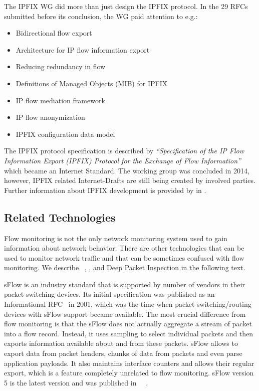 The IPFIX WG did more than just design the IPFIX protocol. In the 29 RFCs submitted before its conclusion, the WG paid attention to e.g.:
\begin{itemize}
	\item Bidirectional flow export~\cite{rfc5103}
	\item Architecture for IP flow information export~\cite{rfc5470}
	\item Reducing redundancy in flow~\cite{rfc5473}
	\item Definitions of Managed Objects (MIB) for IPFIX~\cite{rfc5815, rfc6615, rfc8038}
	\item IP flow mediation framework~\cite{rfc5982, rfc6183}
	\item IP flow anonymization~\cite{rfc6235}
	\item IPFIX configuration data model~\cite{rfc6728}
\end{itemize}
The IPFIX protocol specification is described by \emph{``Specification of the IP Flow Information Export (IPFIX) Protocol for the Exchange of Flow Information''}~\cite{rfc7011} which became an Internet Standard. The working group was concluded in 2014, however, IPFIX related Internet-Drafts are still being created by involved parties. Further information about IPFIX development is provided by \citeauthor{Brownlee-2011-Flow} in \cite{Brownlee-2011-Flow}.

\subsection{Related Technologies}

Flow monitoring is not the only network monitoring system used to gain information about network behavior. There are other technologies that can be used to monitor network traffic and that can be sometimes confused with flow monitoring. We describe ~\cite{Phaal-2004-sFlow}, ,  and Deep Packet Inspection in the following text.

sFlow is an industry standard that is supported by number of vendors in their packet switching devices. Its initial specification was published as an Informational RFC~\cite{rfc3176} in 2001, which was the time when packet switching/routing devices with sFlow support became available. The most crucial difference from flow monitoring is that the sFlow does not actually aggregate a stream of packet into a flow record. Instead, it uses sampling to select individual packets and then exports information available about and from these packets. sFlow allows to export data from packet headers, chunks of data from packets and even parse application payloads. It also maintains interface counters and allows their regular export, which is a feature completely unrelated to flow monitoring. sFlow version 5 is the latest version and was published in ~\citeyear{Phaal-2004-sFlow}~\cite{Phaal-2004-sFlow}.

